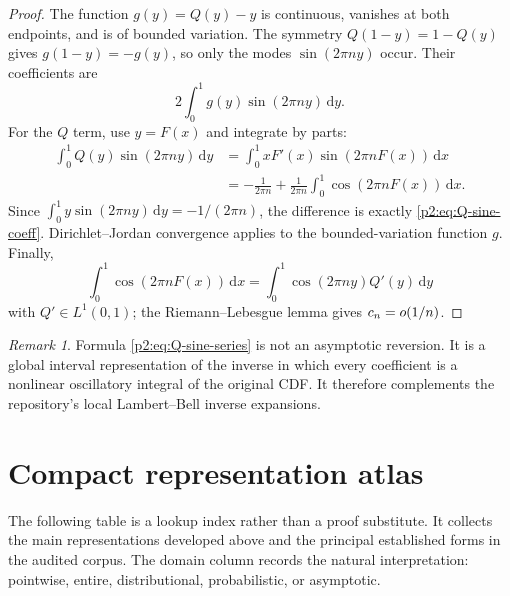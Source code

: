 \documentclass[11pt]{article}
\theoremstyle{definition}
\theoremstyle{remark}
\newtheorem{remark}[theorem]{Remark}
\newcommand{\dd}{\,\mathrm d}
\begin{document}
\begin{proof}
The function $g(y)=Q(y)-y$ is continuous, vanishes at both endpoints, and is of bounded
variation.  The symmetry $Q(1-y)=1-Q(y)$ gives $g(1-y)=-g(y)$, so only the modes
$\sin(2\pi ny)$ occur.  Their coefficients are
\[
 2\int_0^1g(y)\sin(2\pi ny)\dd y.
\]
For the $Q$ term, use $y=F(x)$ and integrate by parts:
\begin{align*}
 \int_0^1Q(y)\sin(2\pi ny)\dd y
 &=\int_0^1xF'(x)\sin(2\pi nF(x))\dd x\\
 &=-\frac1{2\pi n}+\frac1{2\pi n}
   \int_0^1\cos(2\pi nF(x))\dd x.
\end{align*}
Since $\int_0^1y\sin(2\pi ny)\dd y=-1/(2\pi n)$, the difference is exactly
\eqref{p2:eq:Q-sine-coeff}.  Dirichlet--Jordan convergence applies to the bounded-variation
function $g$.  Finally,
\[
 \int_0^1\cos(2\pi nF(x))\dd x
 =\int_0^1\cos(2\pi ny)Q'(y)\dd y
\]
with $Q'\in L^1(0,1)$; the Riemann--Lebesgue lemma gives $c_n=o(1/n)$.
\end{proof}

\begin{remark}
Formula \eqref{p2:eq:Q-sine-series} is not an asymptotic reversion.  It is a global interval
representation of the inverse in which every coefficient is a nonlinear oscillatory integral
of the original CDF.  It therefore complements the repository's local Lambert--Bell inverse
expansions.
\end{remark}

\section{Compact representation atlas}
\label{p2:sec:atlas}

The following table is a lookup index rather than a proof substitute.  It collects the main
representations developed above and the principal established forms in the audited corpus.
The domain column records the natural interpretation: pointwise, entire, distributional,
probabilistic, or asymptotic.
\end{document}
